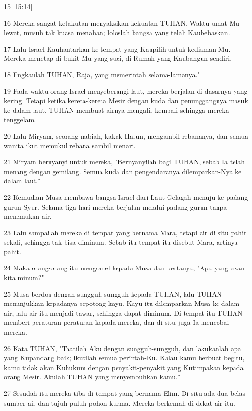 \par 15 [15:14]
\par 16 Mereka sangat ketakutan menyaksikan kekuatan TUHAN. Waktu umat-Mu lewat, musuh tak kuasa menahan; loloslah bangsa yang telah Kaubebaskan.
\par 17 Lalu Israel Kauhantarkan ke tempat yang Kaupilih untuk kediaman-Mu. Mereka menetap di bukit-Mu yang suci, di Rumah yang Kaubangun sendiri.
\par 18 Engkaulah TUHAN, Raja, yang memerintah selama-lamanya."
\par 19 Pada waktu orang Israel menyeberangi laut, mereka berjalan di dasarnya yang kering. Tetapi ketika kereta-kereta Mesir dengan kuda dan penunggangnya masuk ke dalam laut, TUHAN membuat airnya mengalir kembali sehingga mereka tenggelam.
\par 20 Lalu Miryam, seorang nabiah, kakak Harun, mengambil rebananya, dan semua wanita ikut memukul rebana sambil menari.
\par 21 Miryam bernyanyi untuk mereka, "Bernyanyilah bagi TUHAN, sebab Ia telah menang dengan gemilang. Semua kuda dan pengendaranya dilemparkan-Nya ke dalam laut."
\par 22 Kemudian Musa membawa bangsa Israel dari Laut Gelagah menuju ke padang gurun Syur. Selama tiga hari mereka berjalan melalui padang gurun tanpa menemukan air.
\par 23 Lalu sampailah mereka di tempat yang bernama Mara, tetapi air di situ pahit sekali, sehingga tak bisa diminum. Sebab itu tempat itu disebut Mara, artinya pahit.
\par 24 Maka orang-orang itu mengomel kepada Musa dan bertanya, "Apa yang akan kita minum?"
\par 25 Musa berdoa dengan sungguh-sungguh kepada TUHAN, lalu TUHAN menunjukkan kepadanya sepotong kayu. Kayu itu dilemparkan Musa ke dalam air, lalu air itu menjadi tawar, sehingga dapat diminum. Di tempat itu TUHAN memberi peraturan-peraturan kepada mereka, dan di situ juga Ia mencobai mereka.
\par 26 Kata TUHAN, "Taatilah Aku dengan sungguh-sungguh, dan lakukanlah apa yang Kupandang baik; ikutilah semua perintah-Ku. Kalau kamu berbuat begitu, kamu tidak akan Kuhukum dengan penyakit-penyakit yang Kutimpakan kepada orang Mesir. Akulah TUHAN yang menyembuhkan kamu."
\par 27 Sesudah itu mereka tiba di tempat yang bernama Elim. Di situ ada dua belas sumber air dan tujuh puluh pohon kurma. Mereka berkemah di dekat air itu.

